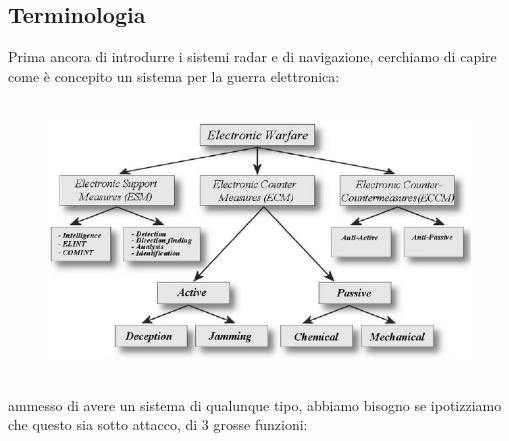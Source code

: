 \documentclass[oneside, 12pt]{extbook}
\begin{document}
\subsection{Terminologia}
Prima ancora di introdurre i  sistemi radar e di navigazione, cerchiamo di capire come è concepito un sistema per la guerra elettronica:\\\\
\begin{figure}[!h]
	\includegraphics[scale=0.3]{immagini/localization/elec_warfare.png}
\end{figure}\\
ammesso di avere un sistema di qualunque tipo, abbiamo bisogno se ipotizziamo che questo sia sotto attacco, di 3 grosse funzioni:
\end{document}
